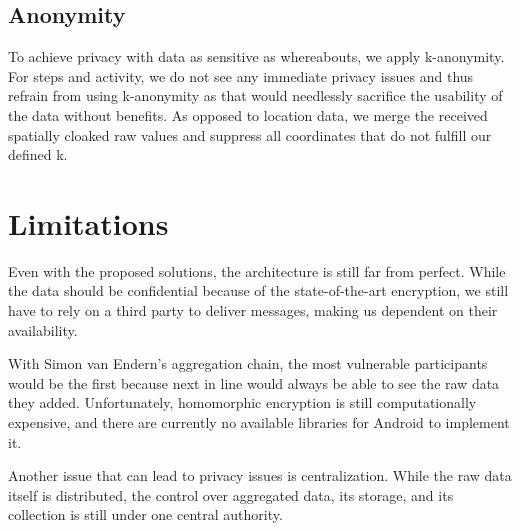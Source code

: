 \subsection{Anonymity}

To achieve privacy with data as sensitive as whereabouts, we apply k-anonymity. For steps and activity, we do not see any immediate privacy issues and thus refrain from using k-anonymity as that would needlessly sacrifice the usability of the data without benefits. As opposed to location data, we merge the received spatially cloaked raw values and suppress all coordinates that do not fulfill our defined k. 

\section{Limitations}
Even with the proposed solutions, the architecture is still far from perfect. While the data should be confidential because of the state-of-the-art encryption, we still have to rely on a third party to deliver messages, making us dependent on their availability.

With Simon van Endern's aggregation chain, the most vulnerable participants would be the first because next in line would always be able to see the raw data they added. Unfortunately, homomorphic encryption is still computationally expensive, and there are currently no available libraries for Android to implement it.

Another issue that can lead to privacy issues is centralization. While the raw data itself is distributed, the control over aggregated data, its storage, and its collection is still under one central authority.